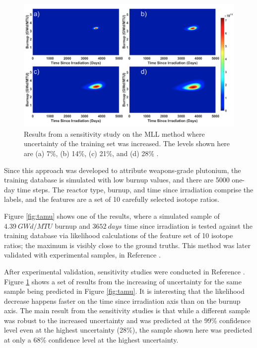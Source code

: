 \begin{figure}[!htb]
  \centering
  \includegraphics[width=\linewidth]{./chapters/litrev/tamu2.png}
  \caption[Sensitivity of likelihood to training set uncertainty]
          {Results from a sensitivity study on the \gls{MLL} method where 
           uncertainty of the training set was increased. The levels shown 
           here are (a) 7\%, (b) 14\%, (c) 21\%, and (d) 28\% 
           \cite{mll_sensitivity}.}
  \label{fig:tamu2}
\end{figure}

Since this approach was developed to attribute weapons-grade plutonium, the
training database is simulated with low burnup values, and there are 5000
one-day time steps.  The reactor type, burnup, and time since irradiation
comprise the labels, and the features are a set of 10 carefully selected
isotope ratios. 

Figure \ref{fig:tamu} shows one of the results, where a simulated sample of
$4.39\:GWd/MTU$ burnup and $3652\:days$ time since irradiation is tested
against the training database via likelihood calculations of the feature set of
10 isotope ratios; the maximum is visibly close to the ground truths.  This
method was later validated with experimental samples, in Reference
\cite{mll_validate}. 

After experimental validation, sensitivity studies were conducted in Reference
\cite{mll_sensitivity}.  Figure \ref{fig:tamu2} shows a set of results from the
increasing of uncertainty for the same sample being predicted in Figure
\ref{fig:tamu}.  It is interesting that the likelihood decrease happens faster
on the time since irradiation axis than on the burnup axis. The main result
from the sensitivity studies is that while a different sample was robust to the
increased uncertainty and was predicted at the 99\% confidence level even at
the highest uncertainty (28\%), the sample shown here was predicted at only a
68\% confidence level at the highest uncertainty.

